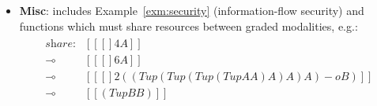 \begin{itemize}[itemsep=0em,leftmargin=1.1em]
\item \textbf{Misc}: includes Example~\ref{exm:security} (information-flow
  security) and functions which must share resources between graded
  modalities, e.g.:
%
\begin{align*}
\begin{array}{rl}
\textit{share} :& [[ {[] 4 A}]] \\ \multimap & [[ [] 6 A ]] \\ \multimap & [[ [] 2 ((Tup (Tup (Tup (Tup A A) A) A) A) -o B)]] \\ \multimap & [[ (Tup B B) ]]
\end{array}
\end{align*}
%
\end{itemize}

